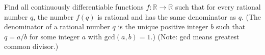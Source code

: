 Find all continuously differentiable functions $f: \mathbb{R} \to \mathbb{R}$
such that for every rational number $q$, the number $f(q)$ is rational
and has the same denominator as $q$. (The denominator of a rational number
$q$ is the unique positive integer $b$ such that $q = a/b$
for some integer $a$ with $\mathrm{gcd}(a,b) = 1$.)
(Note: gcd means greatest common
divisor.)
